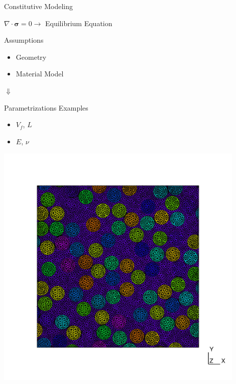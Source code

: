 \begin{frame}{Constitutive Modeling}
\begin{center}
  $\nabla \cdot \boldsymbol{\sigma} =0 \to  $ Equilibrium Equation 
\end{center}
 
\begin{minipage}{0.45\textwidth}
  \begin{block}{\color{White} Assumptions}
   \begin{itemize}
      \item Geometry 
      \item Material Model
   \end{itemize}
  \end{block} 
   {
  \centering
    $\Downarrow$
  \begin{block}{\color{White} Parametrizations Examples}
   \begin{itemize}
      \item $V_f$, $L$
      \item $E$, $\nu$
   \end{itemize}
  \end{block}}
\end{minipage}%
\hspace{1cm}
\begin{minipage}{0.45\textwidth}
  \centering
  \includegraphics[width=0.9\textwidth]{Figures/surrogate/rve81.pdf}
\end{minipage}
\end{frame}

